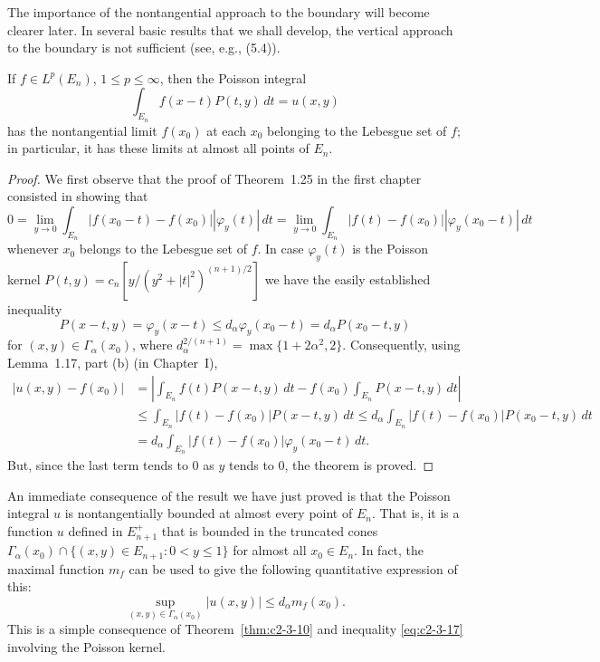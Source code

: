 The importance of the nontangential approach to the boundary will become clearer later. In several basic results that we shall develop, the vertical approach to the boundary is not sufficient (see, e.g., (5.4)).

\begin{theorem}\label{thm:c2-3-16}
If $f \in L^p(E_n)$, $1 \leq p \leq \infty$, then the Poisson integral
\[
\int_{E_n} f(x - t) P(t, y)\,dt = u(x, y)
\]
has the nontangential limit $f(x_0)$ at each $x_0$ belonging to the Lebesgue set of $f$; in particular, it has these limits at almost all points of $E_n$.
\end{theorem}

\begin{proof}
We first observe that the proof of Theorem~1.25 in the first chapter consisted in showing that
\[
0 = \lim_{y \to 0} \int_{E_n} |f(x_0 - t) - f(x_0)| |\varphi_y(t)|\,dt = \lim_{y \to 0} \int_{E_n} |f(t) - f(x_0)| |\varphi_y(x_0 - t)|\,dt
\]
whenever $x_0$ belongs to the Lebesgue set of $f$. In case $\varphi_y(t)$ is the Poisson kernel $P(t, y) = c_n[y/(y^2 + |t|^2)^{(n+1)/2}]$ we have the easily established inequality
\begin{equation}\label{eq:c2-3-17}
P(x - t, y) = \varphi_y(x - t) \leq d_\alpha \varphi_y(x_0 - t) = d_\alpha P(x_0 - t, y)
\end{equation}
for $(x, y) \in \Gamma_\alpha(x_0)$, where $d_\alpha^{2/(n+1)} = \max\{1 + 2\alpha^2, 2\}$. Consequently, using Lemma~1.17, part (b) (in Chapter~I),
\[
\begin{aligned}
|u(x, y) - f(x_0)| &= \left|\int_{E_n} f(t) P(x - t, y)\,dt - f(x_0) \int_{E_n} P(x - t, y)\,dt\right| \\
&\leq \int_{E_n} |f(t) - f(x_0)| P(x - t, y)\,dt \leq d_\alpha \int_{E_n} |f(t) - f(x_0)| P(x_0 - t, y)\,dt \\
&= d_\alpha \int_{E_n} |f(t) - f(x_0)| \varphi_y(x_0 - t)\,dt.
\end{aligned}
\]
But, since the last term tends to $0$ as $y$ tends to $0$, the theorem is proved.
\end{proof}

An immediate consequence of the result we have just proved is that the Poisson integral $u$ is nontangentially bounded at almost every point of $E_n$. That is, it is a function $u$ defined in $E_{n+1}^+$ that is bounded in the truncated cones $\Gamma_\alpha(x_0) \cap \{(x, y) \in E_{n+1} : 0 < y \leq 1\}$ for almost all $x_0 \in E_n$. In fact, the maximal function $m_f$ can be used to give the following quantitative expression of this:
\begin{equation}\label{eq:c2-3-18}
\sup_{(x,y) \in \Gamma_\alpha(x_0)} |u(x, y)| \leq d_\alpha m_f(x_0).
\end{equation}
This is a simple consequence of Theorem~\ref{thm:c2-3-10} and inequality \eqref{eq:c2-3-17} involving the Poisson kernel.

